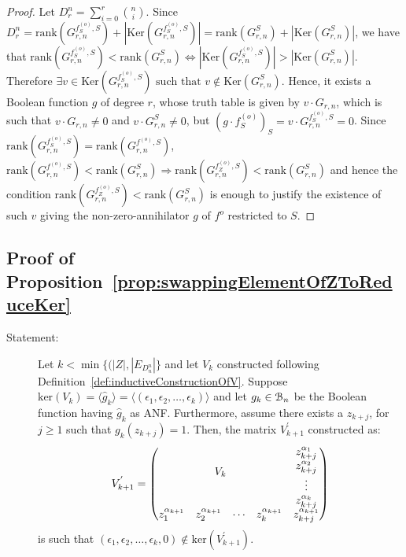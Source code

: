 \documentclass[11pt]{llncs}
\begin{document}
\begin{proof}
	Let $D_r^n = \sum_{i=0}^r \binom{n}{i}$. Since $D_r^n = \text{rank}(G^{f^{(o)}_S,S}_{r,n}) + |\text{Ker}(G^{f^{(o)}_S,S}_{r,n})| =  \text{rank}(G^{S}_{r,n}) + |\text{Ker}(G^{S}_{r,n})|$, we have that
	$\text{rank}(G^{f_S^{(o)},S}_{r,n}) < \text{rank}(G^{S}_{r,n}) \iff |\text{Ker}(G^{f_S^{(o)},S}_{r,n})| > |\text{Ker}(G^{S}_{r,n})|$. 
	Therefore $\exists v\in \text{Ker}(G^{f_S^{(o)},S}_{r,n}) \mbox{ such that }v\not\in \text{Ker}(G^{S}_{r,n})$. 
	Hence, it exists a Boolean function $g$ of degree $r$, whose truth table is given by $v \cdot G_{r,n}$, which is such that $v \cdot G_{r,n}\neq 0$ and $v \cdot G_{r,n}^{S}\neq 0$, but $(g \cdot f_S^{(o)})_S = v \cdot G_{r,n}^{f_S^{(o)},S} = 0$.
	Since $\text{rank}\left(G_{r,n}^{f_S^{(o)}, S}\right) = \text{rank}\left(G_{r,n}^{f^{(o)}, S}\right)$, $\text{rank}(G^{f^{(o)},S}_{r,n}) < \text{rank}(G^{S}_{r,n}) \Rightarrow \text{rank}(G^{f_Z^{(o)},S}_{r,n}) < \text{rank}(G^{S}_{r,n})$ and hence the condition $\text{rank}(G^{f_Z^{(o)},S}_{r,n}) < \text{rank}(G^{S}_{r,n})$ is enough to justify the existence of such $v$ giving the non-zero-annihilator $g$ of $f^{o}$ restricted to $S$.
\end{proof}

\subsection{Proof of Proposition~\ref{prop:swappingElementOfZToReduceKer}}
\begin{description}
    \item[Statement:] Let $k < \min\{(|Z|, |E_{D_n^n}|\}$ and let $V_k$ constructed following Definition~\ref{def:inductiveConstructionOfV}. 
    Suppose $\text{ker}(V_k) = \langle \hat{g}_k \rangle=\langle (\epsilon_1, \epsilon_2, \dots, \epsilon_k) \rangle $ and let $g_k\in \mathcal{B}_{n}$ be the Boolean function having $\hat{g}_k$ as ANF. 
    Furthermore, assume there exists a $z_{k+j}$, for $j\geq 1$ such that $g_k(z_{k+j}) = 1$. Then, the matrix $V^{'}_{k+1}$ constructed as:
    \begin{align*}
        V^{'}_{k+1} = 
        \begin{pmatrix}
        \multicolumn{4}{c}{\multirow{4}{*}{$V_{k}$}} & z_{k+j}^{\alpha_{1}}\\
        & & & & z_{k+j}^{\alpha_{2}}\\
        & & & & \vdots\\
        & & & & z_{k+j}^{\alpha_{k}}\\
        z_{1}^{\alpha_{k+1}} & z_{2}^{\alpha_{k+1}}& \cdots & z_{k}^{\alpha_{k+1}} & z_{k+j}^{\alpha_{k+1}}
    \end{pmatrix}
    \end{align*}
    is such that $(\epsilon_1, \epsilon_2, \dots, \epsilon_k, 0) \not\in \text{ker}(V^{'}_{k+1})$. 
\end{description}
\end{document}
